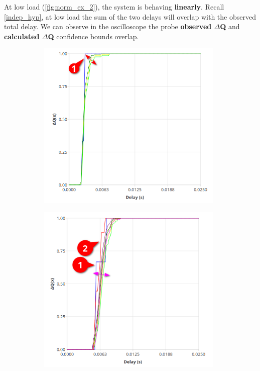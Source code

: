     At low load (\cref{fig:norm_ex_2}), the system is behaving \textbf{linearly}. Recall \cref{indep_hyp}, at low load the sum of the two delays will overlap with the observed total delay. We can observe in the oscilloscope the probe \textbf{observed $\Delta$Q} and \textbf{calculated $\Delta$Q} confidence bounds overlap. 
        \begin{figure}[H]
            \centering
            \begin{subfigure}{.5\textwidth}
                \centering
                \includegraphics[width=0.98\textwidth]{img/overload_2/50_workeran.png}
                \label{fig:norm_ex_1}
            \end{subfigure}%
            \begin{subfigure}{.5\textwidth}
                \centering
                \includegraphics[width =0.98\textwidth]{img/overload_2/50_probe2.png}

\end{subfigure}
\end{figure}
